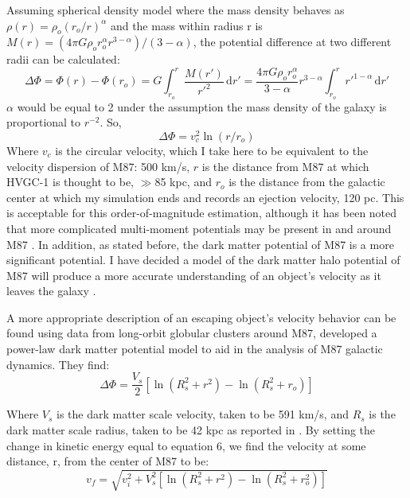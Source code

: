 \documentclass{aastex62}
\begin{document}
Assuming spherical density model where the mass density behaves as $\rho(r) = \rho_{o}(r_{o}/r)^\alpha$ and the mass within radius r is $M(r) = (4\pi G\rho_{o}r_{o}^\alpha r^{3-\alpha})/(3-\alpha)$, the potential difference at two different radii can be calculated:
\begin{equation}
\Delta\Phi = \Phi(r) - \Phi(r_{o}) = G\int_{r_{o}}^{r} \! \frac{M(r')}{r'^2} \, \mathrm{d}r' = \frac{4\pi G\rho_{o}r_{o}^\alpha }{3-\alpha} r^{3-\alpha}\int_{r_{o}}^{r} \! r'^{1-\alpha} \, \mathrm{d}r'
\end{equation}
 $\alpha$ would be equal to 2 under the assumption the mass density of the galaxy is proportional to $r^{-2}$. So,
\begin{equation}
 \Delta\Phi= v_{c}^{2}\ln(r/r_{o})
\end{equation}
Where $v_{c}$ is the circular velocity, which I take here to be equivalent to the velocity dispersion of M87: 500 km/s, $r$ is the distance from M87 at which HVGC-1 is thought to be, $\gg$85 kpc, and $r_{o}$ is the distance from the galactic center at which my simulation ends and records an ejection velocity, 120 pc. This is acceptable for this order-of-magnitude estimation, although it has been noted that more complicated multi-moment potentials may be present in and around M87 \citep{mur14}. In addition, as stated before, the dark matter potential of M87 is a more significant potential. I have decided a model of the dark matter halo potential of M87 will produce a more accurate understanding of an object's velocity as it leaves the galaxy \citep{zhu14}. 

A more appropriate description of an escaping object's velocity behavior can be found using data from long-orbit globular clusters around M87, \citet{zhu14} developed a power-law dark matter potential model to aid in the analysis of M87 galactic dynamics. They find:
\begin{equation}
\Delta\Phi = \frac{V_{s}}{2}[\ln(R_{s}^2 + r^2) - \ln(R_{s}^2 + r_{o})]
\end{equation}

Where $V_{s}$ is the dark matter scale velocity, taken to be 591 km/s, and $R_{s}$ is the dark matter scale radius, taken to be 42 kpc as reported in \citet{zhu14}. By setting the change in kinetic energy equal to equation 6, we find the velocity at some distance, r, from the center of M87 to be:
\begin{equation}
v_{f} = \sqrt{v_{i}^2 + V_{s}^{2}[\ln(R_{s}^2 + r^2) - \ln(R_{s}^2 + r_{o}^2)]}
\end{equation}
\end{document}
